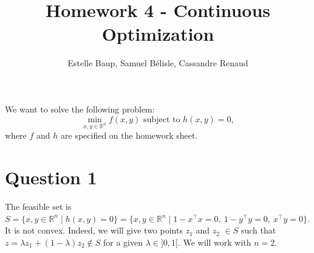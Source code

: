 \documentclass{article}
\title{Homework 4 - Continuous Optimization}
\author{Estelle Baup, Samuel Bélisle, Cassandre Renaud }
\newcommand{\R}{\mathbb{R}}
\newcommand{\tp}{^\top}
\begin{document}
\maketitle

We want to solve the following problem:
\begin{equation*} \tag{P}\label{P}
\min_{x,y\in\R^n} f(x, y) \text{ subject to } h(x,y)=0,
\end{equation*}
where $f$ and $h$ are specified on the homework sheet.

\section*{Question 1}


The feasible set is $S=\{x,y \in \R^n \mid h(x,y)=0\}=\{x,y \in \R^n \mid 1-x\tp x=0,\ 1-y\tp y=0,\ x\tp y=0 \}$. \\
It is not convex. Indeed, we will give two points $z_1$ and $z_2$ $\in S$ such that $z=\lambda z_1 + (1-\lambda) z_2 \notin S$ for a given $\lambda\in ]0,1[$. We will work with $n=2$.\\
\end{document}

